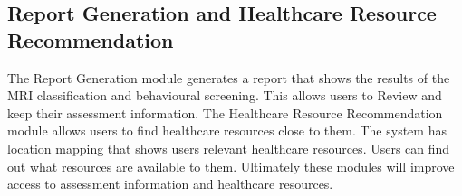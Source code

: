 \documentclass[conference]{IEEEtran}
\begin{document}
\subsection{Report Generation and Healthcare Resource Recommendation}
The Report Generation module generates a report that shows the results of the MRI classification and behavioural screening. This allows users to Review and keep their assessment information. The Healthcare Resource Recommendation module allows users to find healthcare resources close to them. The system has location mapping that shows users relevant healthcare resources. Users can find out what resources are available to them. Ultimately these modules will improve access to assessment information and healthcare resources.

\end{document}
